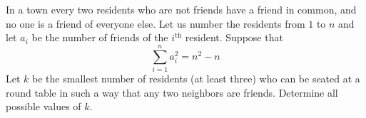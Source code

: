 In a town every two residents who are not friends have a friend in common, and no one is a friend of everyone else. Let us number the residents from  \(1\) to \(n\) and let \(a_i\) be the number of friends of the \(i^{\text{th}}\) resident. Suppose that
\[ \sum_{i=1}^{n}a_i^2=n^2-n \]
Let \(k\) be the smallest number of residents (at least three) who can be seated at a round table in such a way that any two neighbors are friends. Determine all possible values of \(k.\)